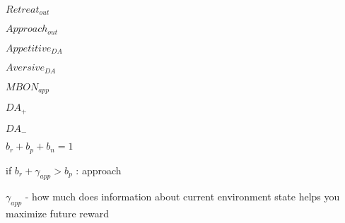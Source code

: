 $Retreat_{out}$

$Approach_{out}$

$Appetitive_{DA}$

$Aversive_{DA}$

$MBON_{app}$

$DA_{+}$

$DA_{-}$

$b_{r} + b_{p} + b_{n} = 1$

if $b_{r} + \gamma_{app} > b_{p}$ : approach

$\gamma_{app}$ - how much does information about current environment state helps you maximize future reward